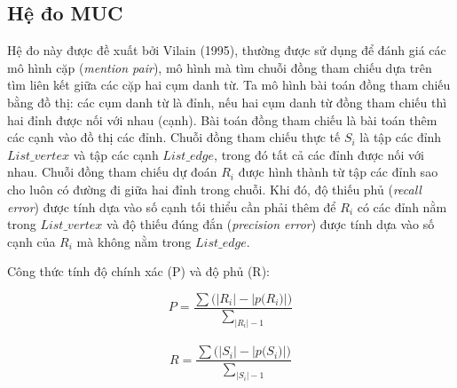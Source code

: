 \documentclass[12pt]{report}
\begin{document}
				\subsection*{Hệ đo MUC}
				\par Hệ đo này được đề xuất bởi Vilain (1995)\cite{vilain95}, thường được sử dụng để đánh giá các mô hình cặp (\textit{mention pair}), mô hình mà tìm chuỗi đồng tham chiếu dựa trên tìm liên kết giữa các cặp hai cụm danh từ. Ta mô hình bài toán đồng tham chiếu bằng đồ thị: các cụm danh từ là đỉnh, nếu hai cụm danh từ đồng tham chiếu thì hai đỉnh được nối với nhau (cạnh). Bài toán đồng tham chiếu là bài toán thêm các cạnh vào đồ thị các đỉnh. Chuỗi đồng tham chiếu thực tế $S_i$ là tập các đỉnh $List\_vertex$ và tập các cạnh $List\_edge$, trong đó tất cả các đỉnh được nối với nhau. Chuỗi đồng tham chiếu dự đoán $R_i$ được hình thành từ tập các đỉnh sao cho luôn có đường đi giữa hai đỉnh trong chuỗi. Khi đó, độ thiếu phủ (\textit{recall error}) được tính dựa vào số cạnh tối thiểu cần phải thêm để $R_i$ có các đỉnh nằm trong $List\_vertex$ và độ thiếu đúng đắn (\textit{precision error}) được tính dựa vào số cạnh của $R_i$ mà không nằm trong $List\_edge$. 
				\par Công thức tính độ chính xác (P) và độ phủ (R): 
					\begin{center}
						\begin{equation*}
							P = \frac{\sum \big(|R_i| - |p \big(R_i)|)}{\sum_{|R_i| - 1}}
						\end{equation*}
						\\
						\begin{equation*}
							R = \frac{\sum \big(|S_i| - |p \big(S_i)|)}{\sum_{|S_i| - 1}}
						\end{equation*}												
					\end{center}
\end{document}
